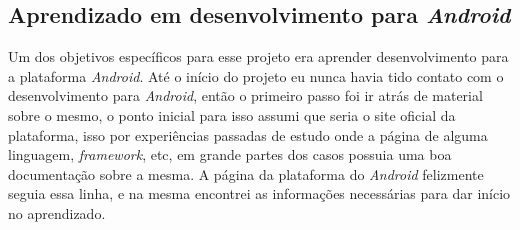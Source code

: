 \documentclass[hidelinks,12pt]{article}
\begin{document}
\subsection{Aprendizado em desenvolvimento para \textit{Android}} \label{learn}
Um dos objetivos espec\'ificos para esse projeto era aprender desenvolvimento para a plataforma \textit{Android}. At\'e o in\'icio do projeto eu nunca havia tido contato com o desenvolvimento para \textit{Android}, ent\~ao o primeiro passo foi ir atr\'as de material sobre o mesmo, o ponto inicial para isso assumi que seria o site oficial da plataforma, isso por experiências passadas de estudo onde a p\'agina de alguma linguagem, \textit{framework}, etc, em grande partes dos casos possuia uma boa documenta\c{c}\~ao sobre a mesma. A p\'agina da plataforma do \textit{Android} felizmente seguia essa linha, e na mesma encontrei as informa\c{c}\~oes necess\'arias para dar in\'icio no aprendizado.
\end{document}

